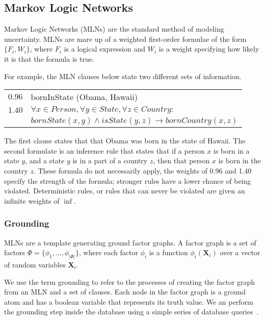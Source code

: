 \subsection{Markov Logic Networks}

Markov Logic Networks (MLNs) are the standard method of modeling uncertainty.
MLNs are mare up of a weighted first-order formulae of the form \(\{F_i, W_i\}\),
where \(F_i\) is a logical expression and \(W_i\) is a weight
specifying how likely it is that the formula is true.

For example, the MLN clauses below state two different sets of information.

\begin{tabular}{l l}
  \(0.96\) & bornInState (Obama, Hawaii) \\
  \(1.40\) & \( \forall x \in Person, \forall y \in State, \forall z \in Country: \) \\
           & \(bornState(x,y) \wedge isState(y,z) \rightarrow bornCountry(x, z)\)
\end{tabular}

The first clause states that that Obama was born in the state of Hawaii.
The second formulate is an inference rule that states that if a person \(x\) is born in a state \(y\), and a state \(y\) is in a part of a country \(z\),
then that person \(x\) is born in the country \(z\).
These formula do not necessarily apply,
the weights of 0.96 and 1.40 specify the strength of the formula; stronger rules have a lower chance of being violated.
Deterministic rules, or rules that can never be violated are given an infinite weights of $\inf$.


\subsubsection{Grounding}

MLNs are a template generating ground factor graphs.
A factor graph is a set of factors \(\Phi = \{ \phi_1, \ldots, \phi_{|\Phi|} \} \),
where each factor \(\phi_i\) is a function \(\phi_i (\mathbf{X}_i)\) over a
vector of random variables \(\mathbf{X}_i\).

We use the term grounding to refer to the processes of creating the factor graph from an
MLN and a set of clauses.
Each node in the factor graph is a ground atom and has a boolean variable that represents its truth value.
We an perform the grounding step inside the database using a simple series of database queries~\cite{chen2014knowledge}.

